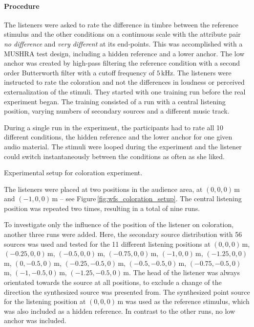 \paragraph{Procedure}
%
The listeners were asked to rate the difference in timbre between the
reference stimulus and the other conditions on a continuous scale with
the attribute pair \emph{no difference} and \emph{very different} at its
end-points. This was accomplished with a {\small MUSHRA}
test design, including a hidden reference and a lower anchor.
The low anchor was created by high-pass
filtering the reference condition with a second order Butterworth filter with a cutoff
frequency of $5$\,kHz. The listeners were instructed to rate the
coloration and not the differences in loudness or perceived externalization of
the stimuli.
They started with one training run before the real experiment began. The
training consisted of a run with a central listening position, varying numbers of
secondary sources and a different music track.

During a single run in the experiment, the participants had to rate all
10 different conditions, the hidden
reference and the lower anchor for one given audio material.
The stimuli were looped during the experiment and the listener could
switch instantaneously between the conditions as often as she liked.
%
\begin{marginfigure}
    \ft
    \centering
    
    \caption{Experimental setup for coloration experiment.
    }
    \label{fig:wfs_coloration_setup}
\end{marginfigure}
%
The listeners were placed at two positions in the audience area, at
$(0,0,0)$\,m and $(-1,0,0)$\,m -- see Figure\,\ref{fig:wfs_coloration_setup}.
The central listening position was repeated two times, resulting in a total of
nine runs.

To investigate only the influence of the position of the listener
on coloration, another three runs were added. Here, the secondary source distribution
with 56 sources was used and
tested for the 11 different listening positions at $(0,0,0)$\,m, $(-0.25,0,0)$\,m,
$(-0.5,0,0)$\,m, $(-0.75,0,0)$\,m, $(-1,0,0)$\,m, $(-1.25,0,0)$\,m,
$(0,-0.5,0)$\,m, \linebreak
$(-0.25,-0.5,0)$\,m, $(-0.5,-0.5,0)$\,m,
$(-0.75,-0.5,0)$\,m, $(-1,-0.5,0)$\,m, $(-1.25,-0.5,0)$\,m. The head of the
listener was always orientated towards the source at all positions, to exclude a
change of the direction the synthesized source was presented from.
The synthesized point source for the listening
position at $(0,0,0)$\,m was used as the reference stimulus, which was also
included as a hidden reference. In contrast to the other runs,
no low anchor was included.

